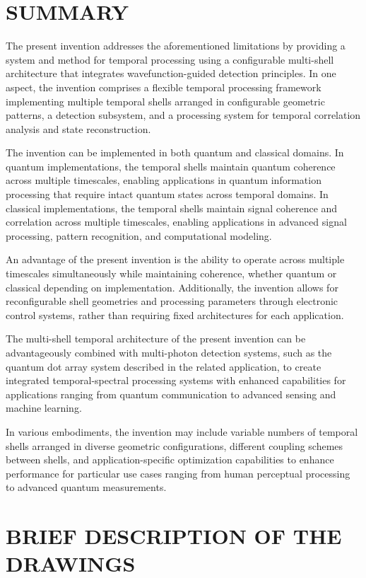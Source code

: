 \documentclass[12pt,letterpaper]{article}
\begin{document}
\section*{SUMMARY}

The present invention addresses the aforementioned limitations by providing a system and method for temporal processing using a configurable multi-shell architecture that integrates wavefunction-guided detection principles. In one aspect, the invention comprises a flexible temporal processing framework implementing multiple temporal shells arranged in configurable geometric patterns, a detection subsystem, and a processing system for temporal correlation analysis and state reconstruction.

The invention can be implemented in both quantum and classical domains. In quantum implementations, the temporal shells maintain quantum coherence across multiple timescales, enabling applications in quantum information processing that require intact quantum states across temporal domains. In classical implementations, the temporal shells maintain signal coherence and correlation across multiple timescales, enabling applications in advanced signal processing, pattern recognition, and computational modeling.

An advantage of the present invention is the ability to operate across multiple timescales simultaneously while maintaining coherence, whether quantum or classical depending on implementation. Additionally, the invention allows for reconfigurable shell geometries and processing parameters through electronic control systems, rather than requiring fixed architectures for each application.

The multi-shell temporal architecture of the present invention can be advantageously combined with multi-photon detection systems, such as the quantum dot array system described in the related application, to create integrated temporal-spectral processing systems with enhanced capabilities for applications ranging from quantum communication to advanced sensing and machine learning.

In various embodiments, the invention may include variable numbers of temporal shells arranged in diverse geometric configurations, different coupling schemes between shells, and application-specific optimization capabilities to enhance performance for particular use cases ranging from human perceptual processing to advanced quantum measurements.

\section*{BRIEF DESCRIPTION OF THE DRAWINGS}
\end{document}
